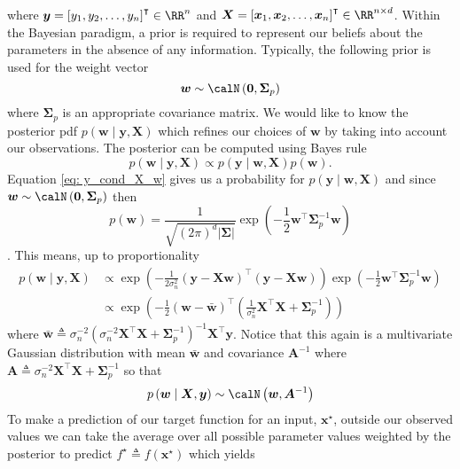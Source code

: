 where $\bm{y} = \left[ y_1 , y_2 , \ldots , y_n \right]^{\intercal} \in \RR^n$ and $\bm{X} = \left[ \bm{x}_1 , \bm{x}_2 , \ldots , \bm{x}_n \right]^{\intercal} \in \RR^{n \times d}$. Within the Bayesian paradigm, a prior is required to represent our beliefs about the parameters in the absence of any information. Typically, the following prior is used for the weight vector
\[
    \bm{w} \sim \calN \left( \bm{0}, \bm{\Sigma}_p \right)
\]
where $\bm{\Sigma}_p$ is an appropriate covariance matrix. We would like to know the posterior pdf $p \left( \bm{w} \mid \bm{y} , \bm{X} \right)$ which refines our choices of $\bm{w}$ by taking into account our observations. The posterior can be computed using Bayes rule
\[
    p \left( \bm{w} \mid \bm{y} , \bm{X} \right) \propto p \left( \bm{y} \mid \bm{w} , \bm{X} \right) p \left( \bm{w} \right).
\]
Equation \ref{eq: y_cond_X_w} gives us a probability for $p \left( \bm{y} \mid \bm{w} , \bm{X} \right)$ and since $\bm{w} \sim \calN \left( \bm{0}, \bm{\Sigma}_p \right)$ then
\begin{equation*}
    p \left( \bm{w} \right) = \frac{1}{\sqrt{\left( 2 \pi \right)^{d} \left| \bm{\Sigma} \right|}} \exp \left( -\frac{1}{2} \bm{w}^{\intercal} \bm{\Sigma}_p^{-1} \bm{w} \right)
\end{equation*}
\cite{KroeseDirkP2014SMaC}. This means, up to proportionality
\begin{align*}
    p \left( \bm{w} \mid \bm{y} , \bm{X} \right)
     & \propto \exp \left( - \frac{1}{2 \sigma_n^2} \left( \bm{y} - \bm{X} \bm{w} \right)^{\intercal} \left( \bm{y} - \bm{X} \bm{w} \right) \right) \exp \left( -\frac{1}{2} \bm{w}^{\intercal} \bm{\Sigma}_p^{-1} \bm{w} \right) \\
     & \propto \exp \left( - \frac{1}{2} \left( \bm{w} - \bar{\bm{w}} \right)^{\intercal} \left( \frac{1}{\sigma^2_n} \bm{X}^{\intercal} \bm{X} + \bm{\Sigma}_p^{-1} \right) \right)
\end{align*}
where $\bar{\bm{w}} \triangleq \sigma_{n}^{-2} \left( \sigma_{n}^{-2} \bm{X}^{\intercal} \bm{X} + \bm{\Sigma}_p^{-1} \right)^{-1} \bm{X}^{\intercal} \bm{y}$. Notice that this again is a multivariate Gaussian distribution with mean $\bar{\bm{w}}$ and covariance $\bm{A}^{-1}$ where $\bm{A} \triangleq \sigma_{n}^{-2} \bm{X}^{\intercal} \bm{X} + \bm{\Sigma}_p^{-1}$ so that
\begin{equation*}
    p \left( \bm{w} \mid \bm{X} , \bm{y} \right) \sim \calN \left( \bm{w} , \bm{A}^{-1} \right)
\end{equation*}
To make a prediction of our target function for an input, $\bm{x}^{\star}$, outside our observed values we can take the average over all possible parameter values weighted by the posterior to predict $f^{\star} \triangleq f \left( \bm{x}^{\star} \right)$ which yields
